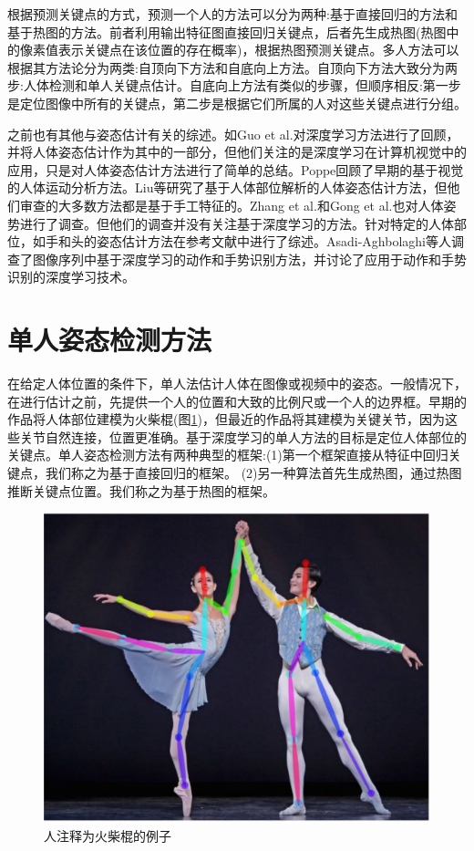 \documentclass[hyperref]{ctexart}
\begin{document}
\begin{multicols}{2}
		根据预测关键点的方式，预测一个人的方法可以分为两种:基于直接回归的方法和基于热图的方法。前者利用输出特征图直接回归关键点，后者先生成热图(热图中的像素值表示关键点在该位置的存在概率)，根据热图预测关键点。多人方法可以根据其方法论分为两类:自顶向下方法和自底向上方法。自顶向下方法大致分为两步:人体检测和单人关键点估计。自底向上方法有类似的步骤，但顺序相反:第一步是定位图像中所有的关键点，第二步是根据它们所属的人对这些关键点进行分组。
		
		之前也有其他与姿态估计有关的综述。如Guo et al.\cite{guo2016deep}对深度学习方法进行了回顾，并将人体姿态估计作为其中的一部分，但他们关注的是深度学习在计算机视觉中的应用，只是对人体姿态估计方法进行了简单的总结。Poppe\cite{poppe2007vision}回顾了早期的基于视觉的人体运动分析方法。Liu等\cite{liu2015survey}研究了基于人体部位解析的人体姿态估计方法，但他们审查的大多数方法都是基于手工特征的。Zhang et al.\cite{zhang2016survey}和Gong et al.\cite{gong2016human}也对人体姿势进行了调查。但他们的调查并没有关注基于深度学习的方法。针对特定的人体部位，如手和头的姿态估计方法在参考文献\cite{murphy2008head}\cite{erol2007vision}中进行了综述。Asadi-Aghbolaghi等人\cite{asadi2017survey}调查了图像序列中基于深度学习的动作和手势识别方法，并讨论了应用于动作和手势识别的深度学习技术。

		
	
		\section{单人姿态检测方法}
		在给定人体位置的条件下，单人法估计人体在图像或视频中的姿态。一般情况下，在进行估计之前，先提供一个人的位置和大致的比例尺或一个人的边界框。早期的作品将人体部位建模为火柴棍(图\ref{e})，但最近的作品将其建模为关键关节，因为这些关节自然连接，位置更准确。基于深度学习的单人方法的目标是定位人体部位的关键点。单人姿态检测方法有两种典型的框架:(1)第一个框架直接从特征中回归关键点，我们称之为基于直接回归的框架。
		(2)另一种算法首先生成热图，通过热图推断关键点位置。我们称之为基于热图的框架。
		\begin{figure}[H]
			\centering
			\includegraphics[scale = 0.4]{5}
			\caption{人注释为火柴棍的例子\cite{ferrari2008progressive}}
			\label{e}
		\end{figure}

\end{multicols}
\end{document}
